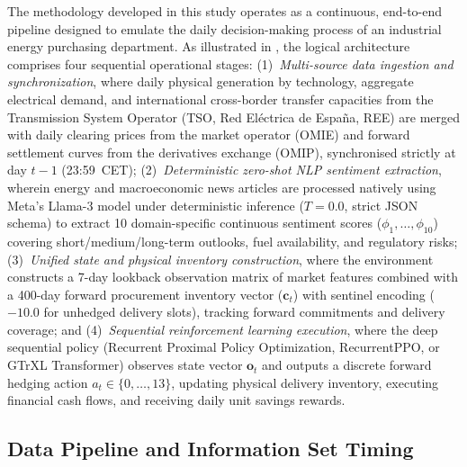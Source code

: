 The methodology developed in this study operates as a continuous, end-to-end pipeline designed to emulate the daily decision-making process of an industrial energy purchasing department. As illustrated in , the logical architecture comprises four sequential operational stages: (1)~\textit{Multi-source data ingestion and synchronization}, where daily physical generation by technology, aggregate electrical demand, and international cross-border transfer capacities from the Transmission System Operator (TSO, Red El\'ectrica de Espa\~na, REE) are merged with daily clearing prices from the market operator (OMIE) and forward settlement curves from the derivatives exchange (OMIP), synchronised strictly at day $t-1$ (23:59~CET); (2)~\textit{Deterministic zero-shot NLP sentiment extraction}, wherein energy and macroeconomic news articles are processed natively using Meta's Llama-3 model under deterministic inference ($T=0.0$, strict JSON schema) to extract 10 domain-specific continuous sentiment scores ($\phi_1, \dots, \phi_{10}$) covering short/medium/long-term outlooks, fuel availability, and regulatory risks; (3)~\textit{Unified state and physical inventory construction}, where the environment constructs a 7-day lookback observation matrix of market features combined with a 400-day forward procurement inventory vector ($\mathbf{c}_t$) with sentinel encoding ($-10.0$ for unhedged delivery slots), tracking forward commitments and delivery coverage; and (4)~\textit{Sequential reinforcement learning execution}, where the deep sequential policy (Recurrent Proximal Policy Optimization, RecurrentPPO, or GTrXL Transformer) observes state vector $\mathbf{o}_t$ and outputs a discrete forward hedging action $a_t \in \{0, \dots, 13\}$, updating physical delivery inventory, executing financial cash flows, and receiving daily unit savings rewards.

\subsection{Data Pipeline and Information Set Timing}
\label{subsec:nlp}

